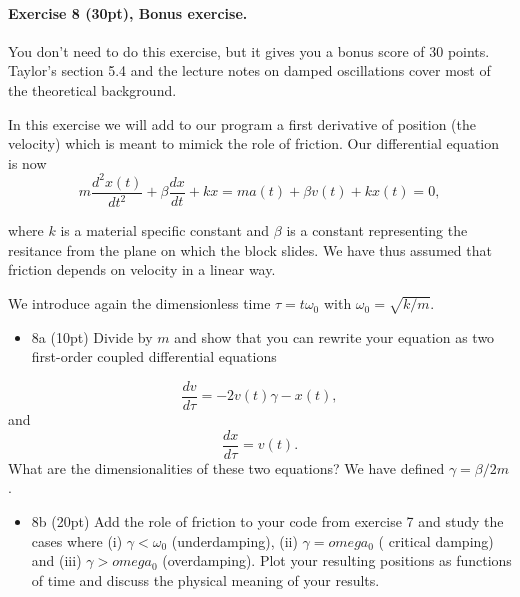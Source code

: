 \documentclass[%
oneside,                 %
final,                   %
10pt]{article}
\begin{document}
\paragraph{Exercise 8 (30pt), Bonus exercise.}
You don't need to do this exercise, but it gives you a bonus score of 30 points. Taylor's section 5.4 and the lecture notes on damped oscillations cover most of the theoretical background.

In this exercise we will add to our program a first derivative of position (the velocity) which is meant to mimick the role of friction.
Our differential equation is now
\[
m\frac{d^2x(t)}{dt^2}+\beta\frac{dx}{dt}+kx=ma(t)+\beta v(t)+kx(t)=0,
\]

where $k$ is a material specific constant and $\beta$ is a constant
representing the resitance from the plane on which the block slides.
We have thus assumed that friction depends on velocity in a linear
way.

We introduce again the dimensionless time $\tau = t\omega_0$ with
$\omega_0=\sqrt{k/m}$.

\begin{itemize}
\item 8a (10pt) Divide by $m$ and show that you can rewrite your equation as two first-order coupled differential equations
\end{itemize}

\noindent
\[
\frac{dv}{d\tau} = -2v(t)\gamma-x(t),
\]
and
\[
\frac{dx}{d\tau} = v(t).
\]
What are the dimensionalities of these two equations? We have defined $\gamma = \beta/2m$.  


\begin{itemize}
\item 8b (20pt)  Add the role of friction to your code from exercise 7 and study the cases where (i) $\gamma < \omega_0$ (underdamping), (ii) $\gamma = omega_0$ ( critical damping) and (iii) $\gamma > omega_0$ (overdamping). Plot your resulting positions as functions of time and discuss the physical meaning of your results.
\end{itemize}

\noindent

\end{document}
